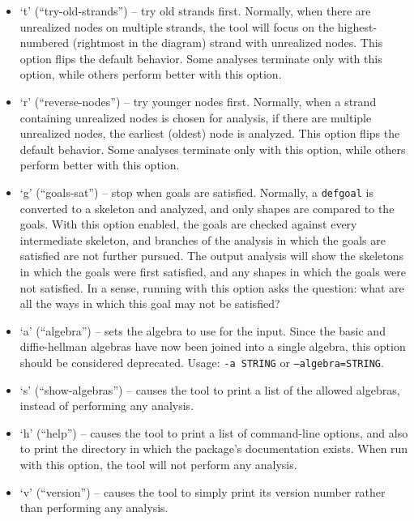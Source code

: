 \begin{itemize}
  tool will consider the largest possible critical term when attempting
  to solve an unrealized node.  This option flips the default behavior.
  Some analyses terminate only with this option, while others perform
  better with this option.
 
\item `t' (``try-old-strands'') -- try old strands first.  Normally,
  when there are unrealized nodes on multiple strands, the tool will
  focus on the highest-numbered (rightmost in the diagram) strand with
  unrealized nodes.  This option flips the default behavior.  Some
  analyses terminate only with this option, while others perform
  better with this option.
 
\item `r' (``reverse-nodes'') -- try younger nodes first.  Normally,
  when a strand containing unrealized nodes is chosen for analysis, if
  there are multiple unrealized nodes, the earliest (oldest) node is
  analyzed.  This option flips the default behavior.  Some analyses
  terminate only with this option, while others perform better with
  this option.
 
\item `g' (``goals-sat'') -- stop when goals are satisfied.  Normally,
  a \texttt{defgoal} is converted to a skeleton and analyzed, and only
  shapes are compared to the goals.  With this option enabled, the
  goals are checked against every intermediate skeleton, and branches
  of the analysis in which the goals are satisfied are not further
  pursued.  The output analysis will show the skeletons in which the
  goals were first satisfied, and any shapes in which the goals were
  not satisfied.  In a sense, running {\cpsa} with this option asks
  the question: what are all the ways in which this goal may not be
  satisfied?
  
\item `a' (``algebra'') -- sets the algebra to use for the
  input. Since the basic and diffie-hellman algebras have now been
  joined into a single algebra, this option should be considered
  deprecated. 
  Usage: \texttt{-a STRING} or \texttt{--algebra=STRING}.
\item `s' (``show-algebras'') -- causes the tool to print a list of the
  allowed algebras, instead of performing any analysis.
\item `h' (``help'') -- causes the tool to print a list of
  command-line options, and also to print the directory in which the
  package's documentation exists.  When run with this option, the tool
  will not perform any analysis.
\item `v' (``version'') -- causes the tool to simply print its version
  number rather than performing any analysis.

\end{itemize}

